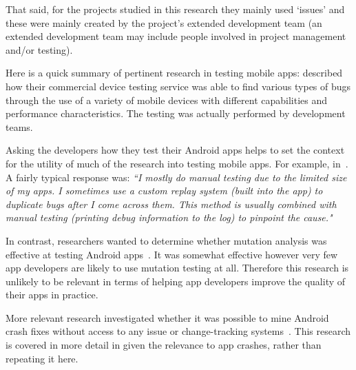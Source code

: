 That said, for the projects studied in this research they mainly used `issues' and these were mainly created by the project's extended development team (an extended development team may include people involved in project management and/or testing).

Here is a quick summary of pertinent research in testing mobile apps: \citeauthor{kaasila2012_testdroid_etc} described how their commercial device testing service was able to find various types of bugs through the use of a variety of mobile devices with different capabilities and performance characteristics. The testing was actually performed by development teams.

Asking the developers how they test their Android apps helps to set the context for the utility of much of the research into testing mobile apps. For example, in~. A fairly typical response was: \emph{``I mostly do manual testing due to the limited size of my apps. I sometimes use a custom replay system (built into the app) to duplicate bugs after I come across them. This method is usually combined with manual testing (printing debug information to the log) to pinpoint the cause."}
    
In contrast, researchers wanted to determine whether mutation analysis was effective at testing Android apps~. It was somewhat effective however very few app developers are likely to use mutation testing at all. Therefore this research is unlikely to be relevant in terms of helping app developers improve the quality of their apps in practice.

More relevant research investigated whether it was possible to mine Android crash fixes without access to any issue or change-tracking systems~. This research is covered in more detail in  given the relevance to app crashes, rather than repeating it here. %

